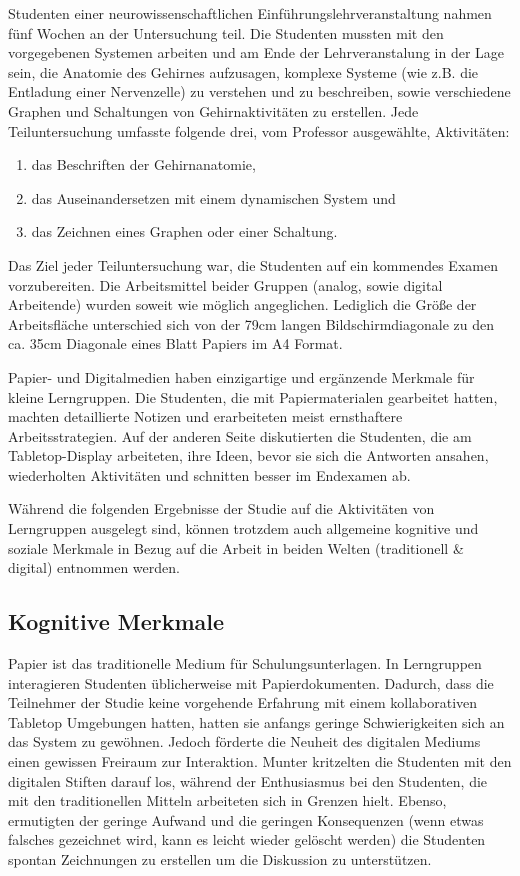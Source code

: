  Studenten einer neurowissenschaftlichen Einführungslehrveranstaltung nahmen fünf Wochen an der Untersuchung teil. Die Studenten mussten mit den vorgegebenen Systemen arbeiten und am Ende der Lehrveranstalung in der Lage sein, die Anatomie des Gehirnes aufzusagen, komplexe Systeme (wie z.B. die Entladung einer Nervenzelle) zu verstehen und zu beschreiben, sowie verschiedene Graphen und Schaltungen von Gehirnaktivitäten zu erstellen. Jede Teiluntersuchung umfasste folgende drei, vom Professor ausgewählte, Aktivitäten:
\begin{enumerate}
	\item das Beschriften der Gehirnanatomie,
	\item das Auseinandersetzen mit einem dynamischen System und
	\item das Zeichnen eines Graphen oder einer Schaltung.
\end{enumerate}
Das Ziel jeder Teiluntersuchung war, die Studenten auf ein kommendes Examen vorzubereiten. Die Arbeitsmittel beider Gruppen (analog, sowie digital Arbeitende) wurden soweit wie möglich angeglichen. Lediglich die Größe der Arbeitsfläche unterschied sich von der 79cm langen Bildschirmdiagonale zu den ca. 35cm Diagonale eines Blatt Papiers im A4 Format.

\medskip Papier- und Digitalmedien haben einzigartige und ergänzende Merkmale für kleine Lerngruppen. Die Studenten, die mit Papiermaterialen gearbeitet hatten, machten detaillierte Notizen und erarbeiteten meist ernsthaftere Arbeitsstrategien. Auf der anderen Seite diskutierten die Studenten, die am Tabletop-Display arbeiteten, ihre Ideen, bevor sie sich die Antworten ansahen, wiederholten Aktivitäten und schnitten besser im Endexamen ab. \citep{Piper:2009}

Während die folgenden Ergebnisse der Studie auf die Aktivitäten von Lerngruppen ausgelegt sind, können trotzdem auch allgemeine kognitive und soziale Merkmale in Bezug auf die Arbeit in beiden Welten (traditionell \& digital) entnommen werden.

\subsection{Kognitive Merkmale}
Papier ist das traditionelle Medium für Schulungsunterlagen. In Lerngruppen interagieren Studenten üblicherweise mit Papierdokumenten. Dadurch, dass die Teilnehmer der Studie keine vorgehende Erfahrung mit einem kollaborativen Tabletop Umgebungen hatten, hatten sie anfangs geringe Schwierigkeiten sich an das System zu gewöhnen. Jedoch förderte die Neuheit des digitalen Mediums einen gewissen Freiraum zur Interaktion. Munter kritzelten die Studenten mit den digitalen Stiften darauf los, während der Enthusiasmus bei den Studenten, die mit den traditionellen Mitteln arbeiteten sich in Grenzen hielt. Ebenso, ermutigten der geringe Aufwand und die geringen Konsequenzen (wenn etwas falsches gezeichnet wird, kann es leicht wieder gelöscht werden) die Studenten spontan Zeichnungen zu erstellen um die Diskussion zu unterstützen. 

